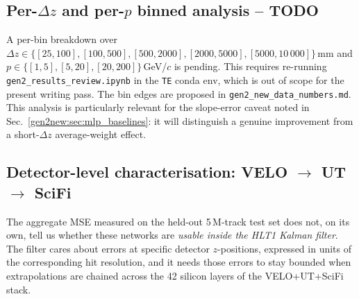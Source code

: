 \documentclass[a4paper,11pt]{article}
\newcommand{\dz}{\Delta z}
\begin{document}
\subsection{Per-$\dz$ and per-$p$ binned analysis -- TODO}

A per-bin breakdown over
$\dz\in\{[25,100],[100,500],[500,2000],[2000,5000],[5000,10\,000]\}$\,mm
and $p\in\{[1,5],[5,20],[20,200]\}$\,GeV/$c$ is pending. This
requires re-running \texttt{gen2\_results\_review.ipynb} in the
\texttt{TE} conda env, which is out of scope for the present writing
pass. The bin edges are proposed in
\texttt{gen2\_new\_data\_numbers.md}. This analysis is particularly
relevant for the slope-error caveat noted in
Sec.~\ref{gen2new:sec:mlp_baselines}: it will distinguish a genuine
improvement from a short-$\dz$ average-weight effect.

\subsection{Detector-level characterisation: VELO $\to$ UT $\to$ SciFi}
\label{gen2new:sec:detector_char}

The aggregate MSE measured on the held-out 5\,M-track test set does
not, on its own, tell us whether these networks are \emph{usable
inside the HLT1 Kalman filter}. The filter cares about errors at
specific detector $z$-positions, expressed in units of the
corresponding hit resolution, and it needs those errors to stay
bounded when extrapolations are chained across the 42 silicon layers
of the VELO+UT+SciFi stack.
\end{document}
